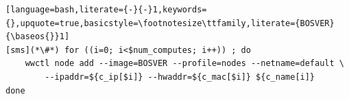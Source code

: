 \begin{lstlisting}[language=bash,literate={-}{-}1,keywords={},upquote=true,basicstyle=\footnotesize\ttfamily,literate={BOSVER}{\baseos{}}1]
[sms](*\#*) for ((i=0; i<$num_computes; i++)) ; do
    wwctl node add --image=BOSVER --profile=nodes --netname=default \
        --ipaddr=${c_ip[$i]} --hwaddr=${c_mac[$i]} ${c_name[i]}
done
\end{lstlisting}
